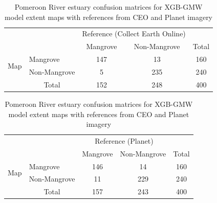 \begin{table}[htbp]
    \caption{Pomeroon River estuary confusion matrices for XGB-GMW model extent maps with references from CEO and Planet imagery}
    \centering

    \begin{tabular}{l|l|c|c|c}
    \multicolumn{2}{c}{}&\multicolumn{2}{c}{Reference (Collect Earth Online)}&\\
    \cline{3-4}
    \multicolumn{2}{c|}{}&Mangrove&Non-Mangrove&\multicolumn{1}{c}{Total}\\
    \cline{2-4}
    \multirow{2}{*}{Map}&Mangrove& 147 & 13 & 160\\
    \cline{2-4}
    & Non-Mangrove & 5 & 235 & 240\\
    \cline{2-4}
    \multicolumn{1}{c}{} & \multicolumn{1}{c}{Total} & \multicolumn{1}{c}{152} & \multicolumn{1}{c}{248} & \multicolumn{1}{c}{400}\\
    \end{tabular}

    \vspace{1.5em}

    \begin{tabular}{l|l|c|c|c}
    \multicolumn{2}{c}{}&\multicolumn{2}{c}{Reference (Planet)}&\\
    \cline{3-4}
    \multicolumn{2}{c|}{}&Mangrove&Non-Mangrove&\multicolumn{1}{c}{Total}\\
    \cline{2-4}
    \multirow{2}{*}{Map}&Mangrove& 146 & 14 & 160\\
    \cline{2-4}
    & Non-Mangrove & 11 & 229 & 240\\
    \cline{2-4}
    \multicolumn{1}{c}{} & \multicolumn{1}{c}{Total} & \multicolumn{1}{c}{157} & \multicolumn{1}{c}{243} & \multicolumn{1}{c}{400}\\
    \end{tabular}
\end{table}
